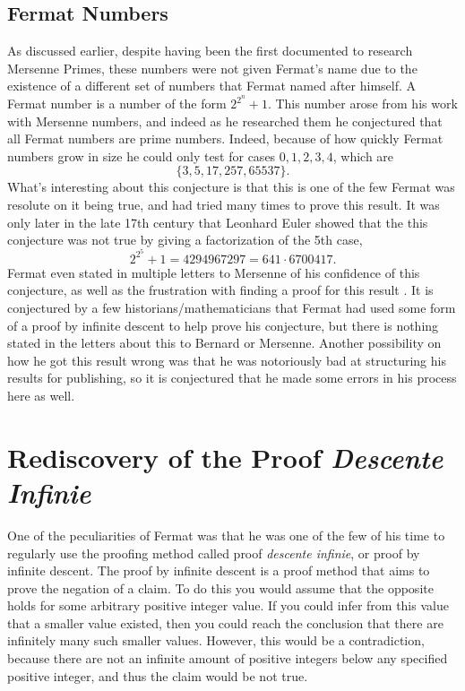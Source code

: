 \documentclass[11pt]{article}
\begin{document}
\subsection*{Fermat Numbers}
As discussed earlier, despite having been the first documented to research 
Mersenne Primes, these numbers were not given Fermat's name due to the existence
of a different set of numbers that Fermat named after himself.
A Fermat number is a number of the form $2^{2^n} +1$.
This number arose from his work with Mersenne numbers, and indeed as he
researched them he conjectured that all Fermat numbers are prime numbers.
Indeed, because of how quickly Fermat numbers grow in size he could only
test for cases $0,1,2,3,4$, which are
    \[\{3, 5, 17, 257, 65537\}. \]
What's interesting about this conjecture is that this is one of the few Fermat
was resolute on it being true, and had tried many times to prove this result.
It was only later in the late 17th century that Leonhard Euler showed that the
this conjecture was not true by giving a factorization of the 5th case,
    \[2^{2^5}+1 = 4294967297 = 641 \cdot 6700417. \]
Fermat even stated in multiple letters to Mersenne of his confidence of this
conjecture, as well as the frustration with finding a proof for
this result \cite{Mahoney, Ball}.
It is conjectured by a few historians/mathematicians that Fermat had used some
form of a proof by infinite descent to help prove his conjecture, but there is
nothing stated in the letters about this to Bernard or Mersenne.
Another possibility on how he got this result wrong was that he was notoriously
bad at structuring his results for publishing, so it is conjectured
that he made some errors in his process here as well.


\section*{Rediscovery of the Proof \emph{Descente Infinie}}
One of the peculiarities of Fermat was that he was one of the few of his time
to regularly use the proofing method called proof \emph{descente infinie}, or
proof by infinite descent.
The proof by infinite descent is a proof method that aims to prove the negation
of a claim.
To do this you would assume that the opposite holds for some arbitrary
positive integer value.
If you could infer from this value that a smaller value existed, then you could
reach the conclusion that there are infinitely many such smaller values.
However, this would be a contradiction, because there are not an infinite amount
of positive integers below any specified positive integer, and thus the claim
would be not true.
\end{document}
